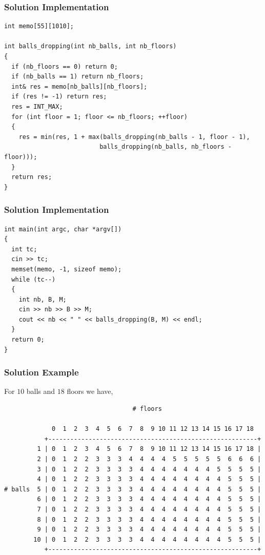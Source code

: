 \documentclass{beamer}
\begin{document}
\begin{frame}[containsverbatim]
\frametitle{Solution Implementation}

\scriptsize
\begin{lstlisting}
int memo[55][1010];

int balls_dropping(int nb_balls, int nb_floors)
{
  if (nb_floors == 0) return 0;
  if (nb_balls == 1) return nb_floors;
  int& res = memo[nb_balls][nb_floors];
  if (res != -1) return res;
  res = INT_MAX;
  for (int floor = 1; floor <= nb_floors; ++floor)
  {
    res = min(res, 1 + max(balls_dropping(nb_balls - 1, floor - 1),
                          balls_dropping(nb_balls, nb_floors - floor)));
  }
  return res;
}
\end{lstlisting}

\end{frame}

\begin{frame}[containsverbatim]
\frametitle{Solution Implementation}

\scriptsize
\begin{lstlisting}
int main(int argc, char *argv[])
{
  int tc;
  cin >> tc;
  memset(memo, -1, sizeof memo);
  while (tc--)
  {
    int nb, B, M;
    cin >> nb >> B >> M;
    cout << nb << " " << balls_dropping(B, M) << endl;
  }
  return 0;
}
\end{lstlisting}

\end{frame}

\begin{frame}[containsverbatim]
\frametitle{Solution Example}

\footnotesize

For $10$ balls and $18$ floors we have,

\scriptsize

\begin{center}
\begin{BVerbatim}
                                   # floors

             0  1  2  3  4  5  6  7  8  9 10 11 12 13 14 15 16 17 18
           +---------------------------------------------------------+
         1 | 0  1  2  3  4  5  6  7  8  9 10 11 12 13 14 15 16 17 18 |
         2 | 0  1  2  2  3  3  3  4  4  4  4  5  5  5  5  5  6  6  6 |
         3 | 0  1  2  2  3  3  3  3  4  4  4  4  4  4  4  5  5  5  5 |
         4 | 0  1  2  2  3  3  3  3  4  4  4  4  4  4  4  4  5  5  5 |
# balls  5 | 0  1  2  2  3  3  3  3  4  4  4  4  4  4  4  4  5  5  5 |
         6 | 0  1  2  2  3  3  3  3  4  4  4  4  4  4  4  4  5  5  5 |
         7 | 0  1  2  2  3  3  3  3  4  4  4  4  4  4  4  4  5  5  5 |
         8 | 0  1  2  2  3  3  3  3  4  4  4  4  4  4  4  4  5  5  5 |
         9 | 0  1  2  2  3  3  3  3  4  4  4  4  4  4  4  4  5  5  5 |
        10 | 0  1  2  2  3  3  3  3  4  4  4  4  4  4  4  4  5  5  5 |
           +---------------------------------------------------------+
\end{BVerbatim}
\end{center}

\end{frame}
\end{document}
